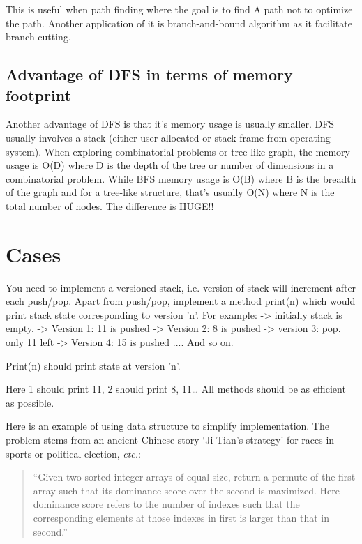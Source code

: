 This is useful when path finding where the goal is to find A path not to optimize the path.
Another application of it is branch-and-bound algorithm as it facilitate branch cutting.


\subsection{Advantage of DFS in terms of memory footprint}

Another advantage of DFS is that it's memory usage is usually smaller.
DFS usually involves a stack (either user allocated or stack frame from operating system).
When exploring combinatorial problems or tree-like graph, the memory usage is O(D) where D is the
depth of the tree or number of dimensions in a combinatorial problem.
While BFS memory usage is O(B) where B is the breadth of the graph and for a tree-like structure,
that's usually O(N) where N is the total number of nodes.
The difference is HUGE!!

\section{Cases}

\label{Evernote:Versioned Stack algorithm}
You need to implement a versioned stack, i.e. version of stack will increment after each push/pop. Apart from push/pop, implement a method print(n) which would print stack state corresponding to version 'n'. For example:
-> initially stack is empty.
-> Version 1: 11 is pushed
-> Version 2: 8 is pushed
-> version 3: pop. only 11 left
-> Version 4: 15 is pushed
....
And so on.

Print(n) should print state at version 'n'.

Here 1 should print 11, 2 should print 8, 11\ldots
All methods should be as efficient as possible.



Here is an example of using  data structure to simplify implementation.
The problem stems from an ancient Chinese story `Ji Tian's strategy' for races in sports or
political election,
\textit{etc.}:
\begin{quote}
    ``Given two sorted integer arrays of equal size, return a permute of the first array
    such that its dominance score over the second is maximized.
    Here dominance score refers to the number of indexes such that the corresponding elements at
    those indexes in first is larger than that in second.''
\end{quote}


